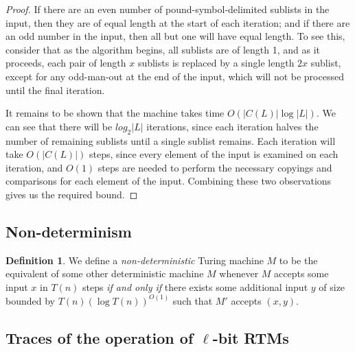 \documentclass[english]{article}
\theoremstyle{plain}
\theoremstyle{definition}
\newtheorem{defn}[thm]{Definition}
\theoremstyle{plain}
\begin{document}
\begin{proof}
  If there are an even number of pound-symbol-delimited sublists in
  the input, then they are of equal length at the start of each
  iteration; and if there are an odd number in the input, then all but
  one will have equal length. To see this, consider that as the
  algorithm begins, all sublists are of length 1, and as it proceeds,
  each pair of length $x$ sublists is replaced by a single length $2x$
  sublist, except for any odd-man-out at the end of the input, which
  will not be processed until the final iteration.

  It remains to be shown that the machine takes time
  $O(|C(L)|\log|L|)$. We can see that there will be $log_2|L|$
  iterations, since each iteration halves the number of remaining
  sublists until a single sublist remains. Each iteration will take
  $O(|C(L)|)$ steps, since every element of the input is examined on
  each iteration, and $O(1)$ steps are needed to perform the necessary
  copyings and comparisons for each element of the input. Combining
  these two observations gives us the required bound.
\end{proof}


\subsection{Non-determinism}

\begin{defn}
  We define a \emph{non-deterministic} Turing machine $M$ to be the
  equivalent of some other deterministic machine $M$ whenever $M$
  accepts some input $x$ in $T(n)$ steps \emph{if and only if} there
  exists some additional input $y$ of size bounded by $T(n)(\log
  T(n))^{O(1)}$ such that $M'$ accepts $(x,y)$.
\end{defn}

\subsection{Traces of the operation of $\ell$-bit RTMs}
\end{document}
